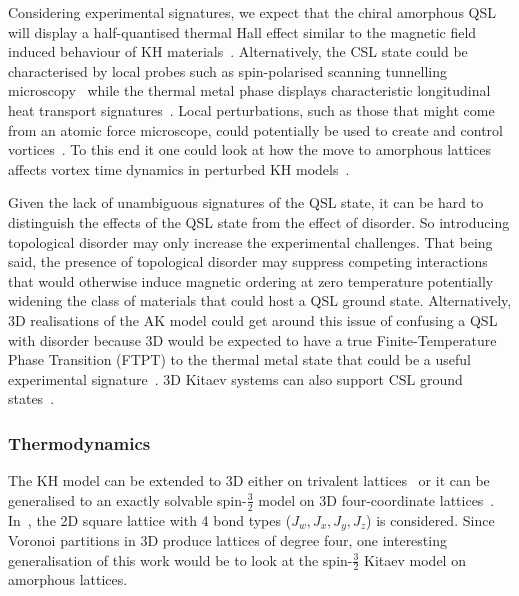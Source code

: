 Considering experimental signatures, we expect that the chiral amorphous QSL will display a half-quantised thermal Hall effect similar to the magnetic field induced behaviour of KH materials~\autocite{Kasahara2018,Yokoi2021,Yamashita2020,Bruin2022}. Alternatively, the CSL state could be characterised by local probes such as spin-polarised scanning tunnelling microscopy~\autocite{Feldmeier2020,Konig2020,Udagawa2021} while the thermal metal phase displays characteristic longitudinal heat transport signatures~\autocite{Beenakker2013}. Local perturbations, such as those that might come from an atomic force microscope, could potentially be used to create and control vortices~\autocite{jangVortexCreationControl2021}. To this end it one could look at how the move to amorphous lattices affects vortex time dynamics in perturbed KH models~\autocite{joyDynamicsVisonsThermal2022}.

Given the lack of unambiguous signatures of the QSL state, it can be hard to distinguish the effects of the QSL state from the effect of disorder. So introducing topological disorder may only increase the experimental challenges. That being said, the presence of topological disorder may suppress competing interactions that would otherwise induce magnetic ordering at zero temperature potentially widening the class of materials that could host a QSL ground state. Alternatively, 3D realisations of the AK model could get around this issue of confusing a QSL with disorder because 3D would be expected to have a true Finite-Temperature Phase Transition (FTPT) to the thermal metal state that could be a useful experimental signature~\autocite{eschmannThermodynamicClassificationThreedimensional2020,OBrienPRB2016}. 3D Kitaev systems can also support CSL ground states~\autocite{mishchenkoChiralSpinLiquids2020}.

\hypertarget{thermodynamics}{%
\subsubsection{Thermodynamics}\label{thermodynamics}}

The KH model can be extended to 3D either on trivalent lattices~\autocite{eschmannThermodynamicClassificationThreedimensional2020,OBrienPRB2016} or it can be generalised to an exactly solvable spin-\(\tfrac{3}{2}\) model on 3D four-coordinate lattices~\autocite{yaoAlgebraicSpinLiquid2009,wenQuantumOrderStringnet2003,ryuThreedimensionalTopologicalPhase2009,Baskaran2008,Nussinov2009,Yao2011,Chua2011,Natori2020,Chulliparambil2020,Chulliparambil2021,Seifert2020,WangHaoranPRB2021,Wu2009}. In~\autocite{yaoAlgebraicSpinLiquid2009}, the 2D square lattice with 4 bond types (\(J_w, J_x, J_y, J_z\)) is considered. Since Voronoi partitions in 3D produce lattices of degree four, one interesting generalisation of this work would be to look at the spin-\(\tfrac{3}{2}\) Kitaev model on amorphous lattices.

